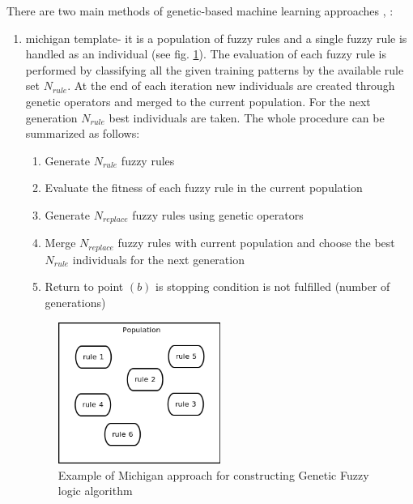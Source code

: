 There are two main methods of genetic-based machine learning approaches
\cite{bib30}, \cite{bib31}:
\begin{enumerate}
    \item michigan template- it is a population of fuzzy rules and a single
        fuzzy rule is handled as an individual (see fig. \ref{fig:michigan}). 
        The evaluation of each fuzzy rule is performed by classifying all the 
        given training patterns by the available rule set $N_{rule}$. At the 
        end of each iteration new individuals are created through genetic operators 
        and merged to the current population. For the next generation $N_{rule}$ 
        best individuals are taken. The whole procedure can be summarized as follows:
        \begin{enumerate}
            \item Generate $N_{rule}$ fuzzy rules
            \item Evaluate the fitness of each fuzzy rule in the current
                population
            \item Generate $N_{replace}$ fuzzy rules using genetic operators
            \item Merge $N_{replac e}$ fuzzy rules with current population and
                choose the best $N_{rule}$ individuals for the next generation
            \item Return to point  $(b)$ is stopping condition is not fulfilled
                (number of generations)
        \end{enumerate}
        \begin{figure}[H]
            \begin{center}
                \includegraphics[width=0.5\textwidth, height=0.4\textwidth]{fig/michigan.png}
            \end{center}
            \caption{Example of Michigan approach for constructing Genetic
            Fuzzy logic algorithm}
            \label{fig:michigan}
        \end{figure}

\end{enumerate}
